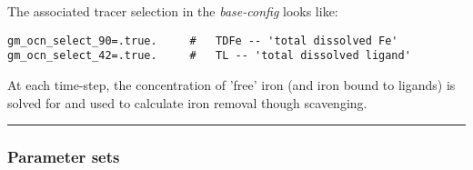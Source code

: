 \documentclass[11pt,fleqn]{book} %
\begin{document}
The associated tracer selection in the \textit{base-config} looks like:
\footnotesize\vspace{-2pt}\begin{verbatim}
gm_ocn_select_90=.true.     #   TDFe -- 'total dissolved Fe'
gm_ocn_select_42=.true.     #   TL -- 'total dissolved ligand'
\end{verbatim}\vspace{-2pt}\normalsize

At each time-step, the concentration of 'free' iron (and iron bound to ligands) is solved for and used to calculate iron removal though scavenging.

%
\noindent\rule{4cm}{0.5pt}
\subsubsection{Parameter sets}
\vspace{2mm}
\end{document}
